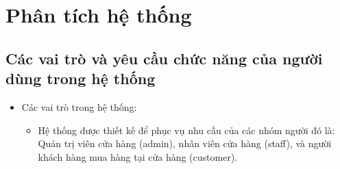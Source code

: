 \section{Phân tích hệ thống}
\subsection{Các vai trò và yêu cầu chức năng của người dùng trong hệ thống}

\begin{itemize}
  \item Các vai trò trong hệ thống:
        \begin{itemize}
          \item Hệ thống được thiết kế để phục vụ nhu cầu của các nhóm người đó là: Quản trị viên cửa hàng (admin), nhân viên cửa hàng (staff), và người khách hàng mua hàng tại cửa hàng (customer).
        \end{itemize}
\end{itemize}

